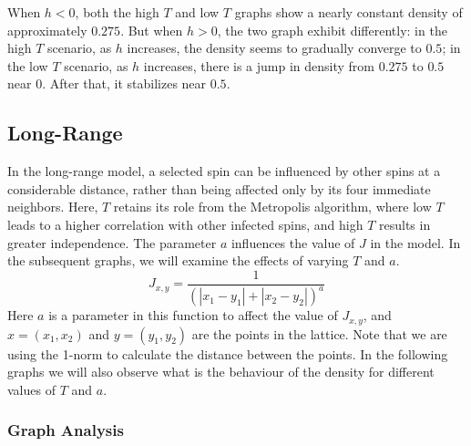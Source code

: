 \documentclass[11pt]{book}
\begin{document}
When $h < 0$, both the high $T$ and low $T$ graphs show a nearly constant density of approximately $0.275$. But when $h > 0$, the two graph exhibit differently: in the high $T$ scenario, as $h$ increases, the density seems to gradually converge to $0.5$; in the low $T$ scenario, as $h$ increases, there is a jump in density from $0.275$ to $0.5$ near 0. After that, it stabilizes near $0.5$.

\subsection{Long-Range}
In the long-range model, a selected spin can be influenced by other spins at a considerable distance, rather than being affected only by its four immediate neighbors. Here, $T$ retains its role from the Metropolis algorithm, where low $T$ leads to a higher correlation with other infected spins, and high $T$ results in greater independence. The parameter $a$ influences the value of $J$ in the model. In the subsequent graphs, we will examine the effects of varying $T$ and $a$.
\[
J_{x,y} = \frac{1}{(\left| x_1 - y_1 \right| + \left| x_2 - y_2 \right|)^a}
\]
Here $a$ is a parameter in this function to affect the value of $J_{x,y}$, and $x=(x_1,x_2)$ and $y=(y_1,y_2)$ are the points in the lattice. Note that we are using the 1-norm to calculate the distance between the points. In the following graphs we will also observe what is the behaviour of the density for different values of $T$ and $a$.

\subsubsection{Graph Analysis}
\end{document}
